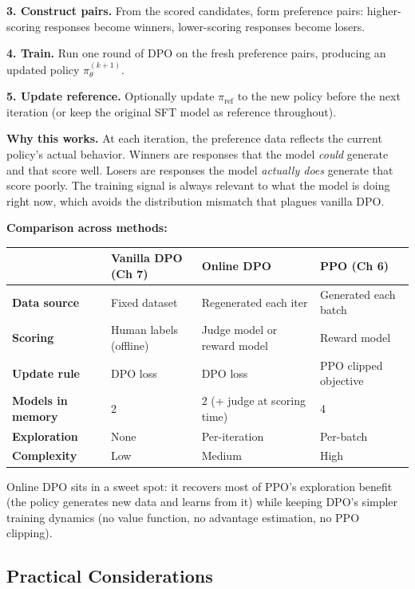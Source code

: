 \begin{chapterenv}
\begin{infobox}
\textbf{3. Construct pairs.} From the scored candidates, form preference pairs: higher-scoring responses become winners, lower-scoring responses become losers.

\textbf{4. Train.} Run one round of DPO on the fresh preference pairs, producing an updated policy $\pi_\theta^{(k+1)}$.

\textbf{5. Update reference.} Optionally update $\pi_{\text{ref}}$ to the new policy before the next iteration (or keep the original SFT model as reference throughout).
\end{infobox}

\textbf{Why this works.} At each iteration, the preference data reflects the current policy's actual behavior. Winners are responses that the model \textit{could} generate and that score well. Losers are responses the model \textit{actually does} generate that score poorly. The training signal is always relevant to what the model is doing right now, which avoids the distribution mismatch that plagues vanilla DPO.

\textbf{Comparison across methods:}

\begin{center}
\small
\begin{tabular}{p{}p{}p{}p{}}
\toprule
& \textbf{Vanilla DPO (Ch 7)} & \textbf{Online DPO} & \textbf{PPO (Ch 6)} \\
\midrule
\textbf{Data source} & Fixed dataset & Regenerated each iter & Generated each batch \\
\textbf{Scoring} & Human labels (offline) & Judge model or reward model & Reward model \\
\textbf{Update rule} & DPO loss & DPO loss & PPO clipped objective \\
\textbf{Models in memory} & 2 & 2 (+ judge at scoring time) & 4 \\
\textbf{Exploration} & None & Per-iteration & Per-batch \\
\textbf{Complexity} & Low & Medium & High \\
\bottomrule
\end{tabular}
\end{center}

Online DPO sits in a sweet spot: it recovers most of PPO's exploration benefit (the policy generates new data and learns from it) while keeping DPO's simpler training dynamics (no value function, no advantage estimation, no PPO clipping).

\subsection{Practical Considerations}


\end{chapterenv}
